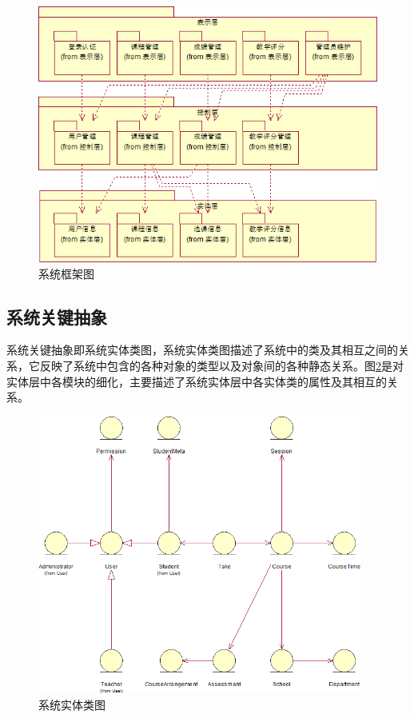 \begin{figure}[H]
  \centering
  \includegraphics[width=\textwidth]{img/jwxt_system_arch}
  \caption{系统框架图}
  \label{fig:system_arch}
\end{figure}

\subsection{系统关键抽象}\label{sec:system_key_abstract}
系统关键抽象即系统实体类图，系统实体类图描述了系统中的类及其相互之间的关系，它反映了系统中包含的各种对象的类型以及对象间的各种静态关系。图\ref{fig:system_entity}是对实体层中各模块的细化，主要描述了系统实体层中各实体类的属性及其相互的关系。

\begin{figure}[H]
  \centering
  \includegraphics[width=0.95\textwidth]{img/system_entity}
  \caption{系统实体类图}
  \label{fig:system_entity}
\end{figure}
